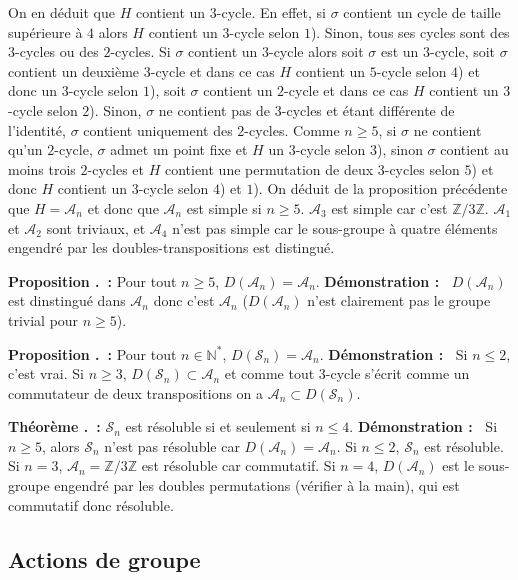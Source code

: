 \documentclass[5pt,a4paper]{article}
\newcounter{prop}[section]
\newcounter{thm}[section]
\renewcommand{\theprop}{\thesection.\arabic{prop}}
\renewcommand{\thethm}{\thesection.\arabic{thm}}
\newcommand{\prop}[1]{\stepcounter{prop}\noindent\textbf{Proposition \theprop ~:} #1 \newline}
\newcommand{\thm}[1]{\stepcounter{thm}\noindent\textbf{Théorème \thethm ~:} #1 \newline}
\newcommand{\demo}[1]{\textbf{Démonstration :~} #1 \newline}
\begin{document}
\begin{onehalfspacing}
{On en déduit que $H$ contient un $3$-cycle. En effet, si $\sigma$ contient un cycle de taille supérieure à $4$ alors $H$ contient un $3$-cycle selon $1$). Sinon, tous ses cycles sont des $3$-cycles ou des $2$-cycles. Si $\sigma$ contient un $3$-cycle alors soit $\sigma$ est un $3$-cycle, soit $\sigma$ contient un deuxième $3$-cycle et dans ce cas $H$ contient un $5$-cycle selon $4$) et donc un $3$-cycle selon $1$), soit $\sigma$ contient un $2$-cycle et dans ce cas $H$ contient un $3$-cycle selon $2$). Sinon, $\sigma$ ne contient pas de $3$-cycles et étant différente de l'identité, $\sigma$ contient uniquement des $2$-cycles. Comme $n \geq 5$, si $\sigma$ ne contient qu'un $2$-cycle, $\sigma$ admet un point fixe et $H$ un $3$-cycle selon $3$), sinon $\sigma$ contient au moins trois $2$-cycles et $H$ contient une permutation de deux $3$-cycles selon $5$) et donc $H$ contient un $3$-cycle selon $4$) et $1$). On déduit de la proposition précédente que $H = \mathcal{A}_n$ et donc que $\mathcal{A}_n$ est simple si $n \geq 5$. $\mathcal{A}_3$ est simple car c'est $\mathbb{Z}/3\mathbb{Z}$. $\mathcal{A}_1$ et $\mathcal{A}_2$ sont triviaux, et $\mathcal{A}_4$ n'est pas simple car le sous-groupe à quatre éléments engendré par les doubles-transpositions est distingué.}


\prop{Pour tout $n \geq 5$, $D(\mathcal{A}_n) = \mathcal{A}_n$.}
\demo{$D(\mathcal{A}_n)$ est dinstingué dans $\mathcal{A}_n$ donc c'est $\mathcal{A}_n$ ($D(\mathcal{A}_n)$ n'est clairement pas le groupe trivial pour $n \geq 5$).}


\prop{Pour tout $n \in \mathbb{N}^*$, $D(\mathcal{S}_n) = \mathcal{A}_n$.}
\demo{Si $n \leq 2$, c'est vrai. Si $n \geq 3$, $D(\mathcal{S}_n) \subset \mathcal{A}_n$ et comme tout $3$-cycle s'écrit comme un commutateur de deux transpositions on a $\mathcal{A}_n \subset D(\mathcal{S}_n)$.}


\thm{$\mathcal{S}_n$ est résoluble si et seulement si $n \leq 4$.}
\demo{Si $n \geq 5$, alors $\mathcal{S}_n$ n'est pas résoluble car $D(\mathcal{A}_n) = \mathcal{A}_n$. Si $n \leq 2$, $\mathcal{S}_n$ est résoluble. Si $n = 3$, $\mathcal{A}_n = \mathbb{Z}/3\mathbb{Z}$ est résoluble car commutatif. Si $n=4$, $D(\mathcal{A}_n)$ est le sous-groupe engendré par les doubles permutations (vérifier à la main), qui est commutatif donc résoluble.}


\subsection{Actions de groupe}


\end{onehalfspacing}
\end{document}
